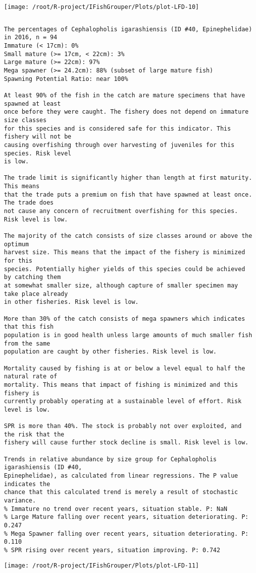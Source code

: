 \documentclass{report}\usepackage[]{graphicx}\usepackage[]{color}
\makeatletter
\def\maxwidth{ %
  \ifdim\Gin@nat@width>\linewidth
    \linewidth
  \else
    \Gin@nat@width
  \fi
}
\newenvironment{kframe}{%
 \def\at@end@of@kframe{}%
 \ifinner\ifhmode%
  \def\at@end@of@kframe{\end{minipage}}%
  \begin{minipage}{\columnwidth}%
 \fi\fi%
 \def\FrameCommand##1{\hskip\@totalleftmargin \hskip-\fboxsep
 \colorbox{shadecolor}{##1}\hskip-\fboxsep
     \hskip-\linewidth \hskip-\@totalleftmargin \hskip\columnwidth}%
 \MakeFramed {\advance\hsize-\width
   \@totalleftmargin\z@ \linewidth\hsize
   \@setminipage}}%
 {\par\unskip\endMakeFramed%
 \at@end@of@kframe}
\newenvironment{knitrout}{}{} %
\makeatother
\begin{document}
\begin{knitrout}
\texttt{[image: /root/R-project/IFishGrouper/Plots/plot-LFD-10]} 
\begin{kframe}\begin{verbatim}
\end{verbatim}
\end{kframe}
\clearpage
\newpage
\begin{kframe}\begin{verbatim}The percentages of Cephalopholis igarashiensis (ID #40, Epinephelidae) in 2016, n = 94
Immature (< 17cm): 0%
Small mature (>= 17cm, < 22cm): 3%
Large mature (>= 22cm): 97%
Mega spawner (>= 24.2cm): 88% (subset of large mature fish)
Spawning Potential Ratio: near 100%
 
At least 90% of the fish in the catch are mature specimens that have spawned at least
once before they were caught. The fishery does not depend on immature size classes
for this species and is considered safe for this indicator. This fishery will not be
causing overfishing through over harvesting of juveniles for this species. Risk level
is low.

The trade limit is significantly higher than length at first maturity.  This means
that the trade puts a premium on fish that have spawned at least once. The trade does
not cause any concern of recruitment overfishing for this species. Risk level is low.

The majority of the catch consists of size classes around or above the optimum
harvest size. This means that the impact of the fishery is minimized for this
species. Potentially higher yields of this species could be achieved by catching them
at somewhat smaller size, although capture of smaller specimen may take place already
in other fisheries. Risk level is low.

More than 30% of the catch consists of mega spawners which indicates that this fish
population is in good health unless large amounts of much smaller fish from the same
population are caught by other fisheries. Risk level is low.
 
Mortality caused by fishing is at or below a level equal to half the natural rate of
mortality. This means that impact of fishing is minimized and this fishery is
currently probably operating at a sustainable level of effort. Risk level is low.
 
SPR is more than 40%. The stock is probably not over exploited, and the risk that the
fishery will cause further stock decline is small. Risk level is low.
 
Trends in relative abundance by size group for Cephalopholis igarashiensis (ID #40,
Epinephelidae), as calculated from linear regressions. The P value indicates the
chance that this calculated trend is merely a result of stochastic variance.
% Immature no trend over recent years, situation stable. P: NaN
% Large Mature falling over recent years, situation deteriorating. P: 0.247
% Mega Spawner falling over recent years, situation deteriorating. P: 0.110
% SPR rising over recent years, situation improving. P: 0.742
\end{verbatim}
\end{kframe}
\texttt{[image: /root/R-project/IFishGrouper/Plots/plot-LFD-11]} 


\end{knitrout}
\end{document}
